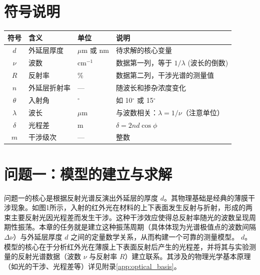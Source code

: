 \documentclass[withoutpreface,bwprint]{cumcmthesis} %
\begin{document}
\section{符号说明}

\begin{center}
    \begin{tabular}{clll}
        \toprule
        符号        & 含义     & 单位          & 说明                            \\
        \midrule
        $d$       & 外延层厚度  & $\mu$m 或 nm & 待求解的核心变量                      \\
        $\nu$     & 波数     & cm$^{-1}$   & 数据第一列，等于 $1/\lambda$ (波长的倒数)  \\
        $R$       & 反射率    & \%          & 数据第二列，干涉光谱的测量值                \\
        $n$       & 外延层折射率 & —           & 随波长和掺杂浓度变化                    \\
        $\theta$  & 入射角    & $^\circ$    & 如 10$^\circ$ 或 15$^\circ$     \\
        $\lambda$ & 波长     & $\mu$m      & 与波数相关：$\lambda = 1/\nu$（注意单位） \\
        $\delta$  & 光程差    & m           & $\delta = 2 n d \cos \phi$    \\
        $m$       & 干涉级次   & —           & 整数                            \\
        \bottomrule
    \end{tabular}
\end{center}


\section{问题一：模型的建立与求解}


问题一的核心是根据反射光谱反演出外延层的厚度 $d$。其物理基础是经典的薄膜干涉现象。如图1所示，入射的红外光在材料的上下表面发生反射与折射，形成的两束主要反射光因光程差而发生干涉。这种干涉效应使得总反射率随光的波数呈现周期性振荡。本章的任务就是建立这种振荡周期（具体体现为光谱极值点的波数间隔 $\Delta\nu$）与外延层厚度 $d$ 之间的定量数学关系，从而构建一个可靠的测量模型。
$d$。模型的核心在于分析红外光在薄膜上下表面反射后产生的光程差，并将其与实验测量的反射光谱数据（波数 $\nu$ 与反射率 $R$）建立联系。其涉及的物理光学基本原理（如光的干涉、光程差等）详见附录\ref{app:optical_basis}。
\end{document}
